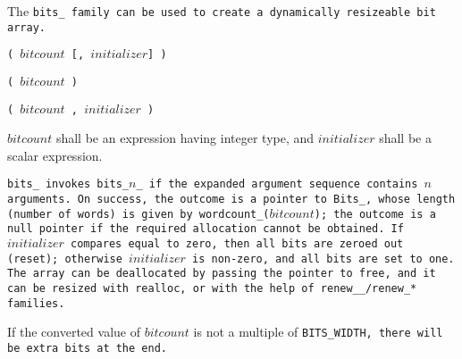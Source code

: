 The \tt{bits_} family can be used to create a dynamically resizeable bit array.


\s\s\s\tt{(} $bitcount$ [\tt{,} $initializer$] \tt{)}

\s\tt{(}   $bitcount$ \tt{)}

\s\tt{(}   $bitcount$ \phantom{[}\tt{,} $initializer$\phantom{]} \tt{)}


$bitcount$ shall be an expression having integer type,
and $initializer$ shall be a scalar expression.


\tt{bits_} invokes \tt{bits_}$n$\_ if the
expanded argument sequence contains $n$ arguments.
On success, the outcome is a pointer to \tt{Bits_},
whose length (number of words) is given by \tt{wordcount_(}$bitcount$\tt{)};
the outcome is a null pointer if the required allocation cannot be obtained.
If $initializer$ compares equal to zero, then all bits are zeroed out (reset);
otherwise $initializer$ is non-zero, and all bits are set to one.
The array can be deallocated by passing the pointer to \tt{free}, and it can be
resized with \tt{realloc}, or with the help of \tt{renew__}/\tt{renew_}* families.

\note If the converted value of $bitcount$ is not a multiple
of \tt{BITS_WIDTH}, there will be extra bits at the end.
